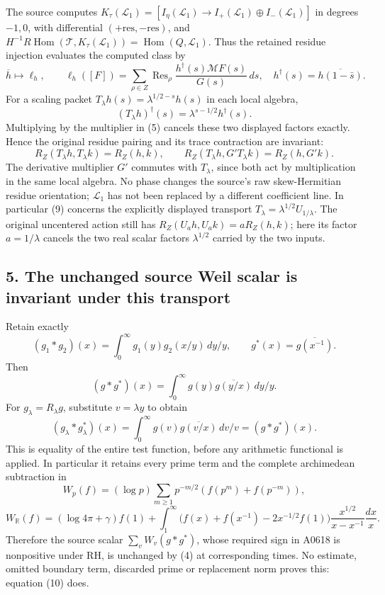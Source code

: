 The source computes
\(K_\tau(\mathcal L_1)=[I_\eta(\mathcal L_1)\to I_+(\mathcal L_1)\oplus I_-(\mathcal L_1)]\)
in degrees \(-1,0\), with differential
\((+\mathrm{res},-\mathrm{res})\), and
\(H^{-1}R\operatorname{Hom}(\mathcal T,K_\tau(\mathcal L_1))=\operatorname{Hom}(Q,\mathcal L_1)\).
Thus the retained residue injection evaluates the computed class by \[
\overline h\longmapsto\ell_h,\qquad
\ell_h([F])=\sum_{\rho\in Z}\operatorname{Res}_\rho
\frac{h^\dagger(s)\mathcal MF(s)}{G(s)}\,ds,
\quad h^\dagger(s)=\overline{h(1-\bar s)}.
\tag{8}
\] For a scaling packet \(T_\lambda h(s)=\lambda^{1/2-s}h(s)\) in each
local algebra, \[
(T_\lambda h)^\dagger(s)=\lambda^{s-1/2}h^\dagger(s).
\] Multiplying by the multiplier in (5) cancels these two displayed
factors exactly. Hence the original residue pairing and its trace
contraction are invariant: \[
R_Z(T_\lambda h,T_\lambda k)=R_Z(h,k),\qquad
R_Z(T_\lambda h,G'T_\lambda k)=R_Z(h,G'k).
\tag{9}
\] The derivative multiplier \(G'\) commutes with \(T_\lambda\), since
both act by multiplication in the same local algebra. No phase changes
the source's raw skew-Hermitian residue orientation; \(\mathcal L_1\)
has not been replaced by a different coefficient line. In particular (9)
concerns the explicitly displayed transport
\(T_\lambda=\lambda^{1/2}U_{1/\lambda}\). The original uncentered action
still has \(R_Z(U_ah,U_ak)=aR_Z(h,k)\); here its factor \(a=1/\lambda\)
cancels the two real scalar factors \(\lambda^{1/2}\) carried by the two
inputs.

\subsection{5. The unchanged source Weil scalar is invariant under this
transport}\label{the-unchanged-source-weil-scalar-is-invariant-under-this-transport}

Retain exactly \[
(g_1*g_2)(x)=\int_0^\infty g_1(y)g_2(x/y)\,dy/y,
\qquad g^*(x)=\overline{g(x^{-1})}.
\] Then \[
(g*g^*)(x)=\int_0^\infty g(y)\overline{g(y/x)}\,dy/y.
\] For \(g_\lambda=R_\lambda g\), substitute \(v=\lambda y\) to obtain
\[
\boxed{(g_\lambda*g_\lambda^*)(x)=\int_0^\infty g(v)\overline{g(v/x)}\,dv/v=(g*g^*)(x).}
\tag{10}
\] This is equality of the entire test function, before any arithmetic
functional is applied. In particular it retains every prime term and the
complete archimedean subtraction in \[
W_p(f)=(\log p)\sum_{m\ge1}p^{-m/2}(f(p^m)+f(p^{-m})),
\] \[
W_{\mathbb R}(f)=(\log4\pi+\gamma)f(1)+
\int_1^\infty\bigl(f(x)+f(x^{-1})-2x^{-1/2}f(1)\bigr)
\frac{x^{1/2}}{x-x^{-1}}\frac{dx}{x}.
\] Therefore the source scalar \(\sum_vW_v(g*g^*)\), whose required sign
in A0618 is nonpositive under RH, is unchanged by (4) at corresponding
times. No estimate, omitted boundary term, discarded prime or
replacement norm proves this: equation (10) does.

